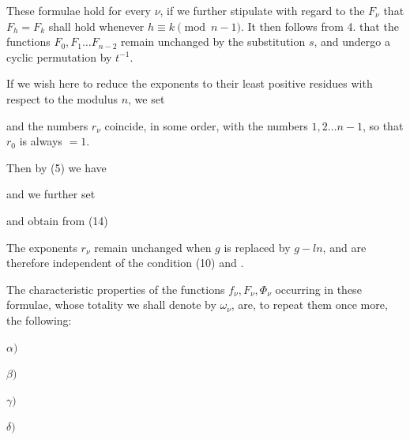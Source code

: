 These formulae hold for every $\nu$, if we further stipulate with regard
to the $F_\nu$ that $F_h = F_k$ shall hold whenever $h \equiv k
\pmod{n-1}$. It then follows from 4. that the functions $F_0,
F_1 \ldots F_{n-2}$ remain unchanged by the substitution $s$, and
undergo a cyclic permutation by $t^{-1}$.

If we wish here to reduce the exponents to their least positive residues
with respect to the modulus $n$, we set


and the numbers $r_\nu$ coincide, in some order, with the numbers
$1, 2 \ldots n-1$, so that $r_0$ is always $= 1$.

Then by (5) we have


and we further set


and obtain from (14)


The exponents $r_\nu$ remain unchanged when $g$ is replaced by $g - l n$,
and are therefore independent of the condition (10) and .

The characteristic properties of the functions $f_\nu, F_\nu, \Phi_\nu$
occurring in these formulae, whose totality we shall denote by $\omega_\nu$,
are, to repeat them once more, the following:

$\alpha)$ 

$\beta)$ 

$\gamma)$ 

$\delta)$ 
